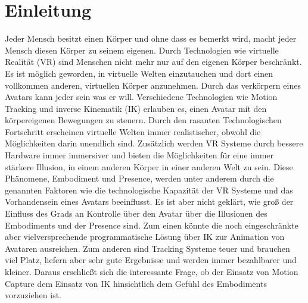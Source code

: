 \chapter{Einleitung}

Jeder Mensch besitzt einen Körper und ohne dass es bemerkt wird, macht jeder Mensch diesen Körper zu seinem eigenen. Durch Technologien wie virtuelle Realität (VR) sind Menschen nicht mehr nur auf den eigenen Körper beschränkt. Es ist möglich geworden, in virtuelle Welten einzutauchen und dort einen vollkommen anderen, virtuellen Körper anzunehmen. Durch das verkörpern eines Avatars kann jeder sein was er will. Verschiedene Technologien wie Motion Tracking und inverse Kinematik (IK) erlauben es,  einen Avatar mit den körpereigenen Bewegungen zu steuern. 
Durch den rasanten Technologischen Fortschritt erscheinen virtuelle Welten immer realistischer, obwohl die Möglichkeiten darin unendlich sind. Zusätzlich werden VR Systeme durch bessere Hardware immer immersiver und bieten die Möglichkeiten für eine immer stärkere Illusion, in einem anderen Körper in einer anderen Welt zu sein. Diese Phänomene, Embodiment und Presence, werden unter anderem durch die genannten Faktoren wie die technologische Kapazität der VR Systeme und das Vorhandensein eines Avatars beeinflusst. Es ist aber nicht geklärt, wie groß der Einfluss des Grads an Kontrolle über den Avatar über die Illusionen des Embodiments und der Presence sind. Zum einen könnte die noch eingeschränkte aber vielversprechende programmatische Lösung über IK zur Animation von Avataren ausreichen. Zum anderen sind Tracking Systeme teuer und brauchen viel Platz, liefern aber sehr gute Ergebnisse und werden immer bezahlbarer und kleiner. Daraus erschließt sich die interessante Frage, ob der Einsatz von Motion Capture dem Einsatz von IK hinsichtlich dem Gefühl des Embodiments vorzuziehen ist.


